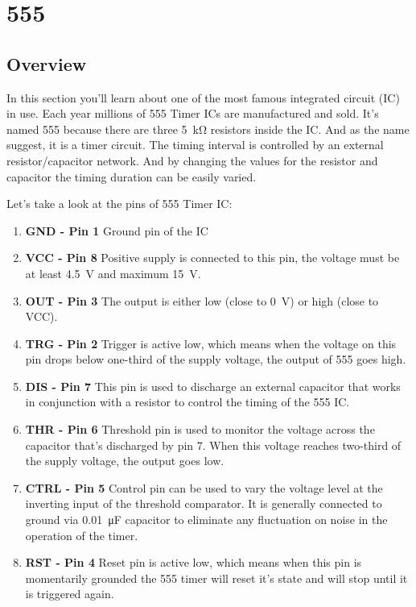 

\chapter{555}

\section{Overview}
In this section you'll learn about one of the most famous integrated circuit (IC) in use. Each year millions of 555 Timer ICs are manufactured and sold.
It's named 555 because there are three \SI{5}{\kilo\ohm} resistors inside the IC. And as the name suggest, it is a timer circuit. The timing interval is controlled by an external resistor/capacitor network. And by changing the values for the resistor and capacitor the timing duration can be easily varied.

Let's take a look at the pins of 555 Timer IC:
\begin{enumerate}
    \item \textbf{GND - Pin 1} Ground pin of the IC
    \item \textbf{VCC - Pin 8} Positive supply is connected to this pin, the voltage must be at least \SI{4.5}{\volt} and maximum \SI{15}{\volt}.
    \item \textbf{OUT - Pin 3} The output is either low (close to \SI{0}{\volt}) or high (close to VCC).
    \item \textbf{TRG - Pin 2} Trigger is active low, which means when the voltage on this pin drops below one-third of the supply voltage, the output of 555 goes high.
    \item \textbf{DIS - Pin 7} This pin is used to discharge an external capacitor that works in conjunction with a resistor to control the timing of the 555 IC.
    \item \textbf{THR - Pin 6} Threshold pin is used to monitor the voltage across the capacitor that's discharged by pin 7. When this voltage reaches two-third of the supply voltage, the output goes low.
    \item \textbf{CTRL - Pin 5} Control pin can be used to vary the voltage level at the inverting input of the threshold comparator. It is generally connected to ground via \SI{0.01}{\micro\farad} capacitor to eliminate any fluctuation on noise in the operation of the timer.
    \item \textbf{RST - Pin 4} Reset pin is active low, which means when this pin is momentarily grounded the 555 timer will reset it's state and will stop until it is triggered again.
\end{enumerate}

